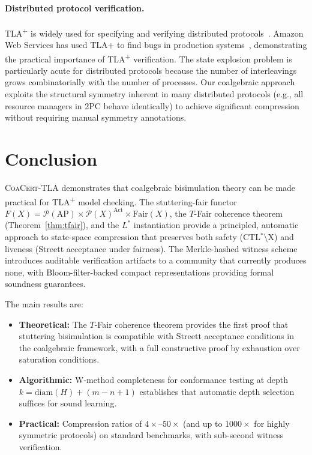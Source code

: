 \documentclass[11pt]{article}
\newcommand{\Pow}{\mathcal{P}}
\newcommand{\Fair}{\ensuremath{\mathrm{Fair}}}
\newcommand{\Act}{\ensuremath{\mathrm{Act}}}
\newcommand{\AP}{\ensuremath{\mathrm{AP}}}
\newcommand{\TFair}{$T$-Fair}
\newcommand{\CoaCert}{\textsc{CoaCert-TLA}}
\newcommand{\TLAplus}{TLA\textsuperscript{+}}
\newcommand{\diam}{\ensuremath{\mathrm{diam}}}
\begin{document}
\paragraph{Distributed protocol verification.}
\TLAplus{} is widely used for specifying and verifying distributed
protocols~\cite{Lamport02}.
Amazon Web Services has used TLA+ to find bugs in production
systems~\cite{NewcombeRZMBD15}, demonstrating the practical importance
of \TLAplus{} verification.
The state explosion problem is particularly acute for distributed protocols
because the number of interleavings grows combinatorially with the number
of processes.
Our coalgebraic approach exploits the structural symmetry inherent in
many distributed protocols (e.g., all resource managers in 2PC behave
identically) to achieve significant compression without requiring
manual symmetry annotations.


\section{Conclusion}
\label{sec:conclusion}

\CoaCert{} demonstrates that coalgebraic bisimulation theory can be made
practical for \TLAplus{} model checking.
The stuttering-fair functor
$F(X) = \Pow(\AP) \times \Pow(X)^{\Act} \times \Fair(X)$,
the \TFair{} coherence theorem (Theorem~\ref{thm:tfair}), and the $L^*$
instantiation provide a principled, automatic approach to state-space
compression that preserves both safety (CTL$^*$$\setminus$X) and liveness
(Streett acceptance under fairness).
The Merkle-hashed witness scheme introduces auditable verification artifacts
to a community that currently produces none, with Bloom-filter-backed
compact representations providing formal soundness guarantees.

The main results are:
\begin{itemize}[nosep]
\item \textbf{Theoretical:} The \TFair{} coherence theorem provides the
  first proof that stuttering bisimulation is compatible with Streett
  acceptance conditions in the coalgebraic framework, with a full
  constructive proof by exhaustion over saturation conditions.
\item \textbf{Algorithmic:} W-method completeness for conformance testing
  at depth $k = \diam(H) + (m - n + 1)$ establishes that automatic
  depth selection suffices for sound learning.
\item \textbf{Practical:} Compression ratios of $4\times$--$50\times$
  (and up to $1000\times$ for highly symmetric protocols) on standard
  benchmarks, with sub-second witness verification.
\end{itemize}
\end{document}
